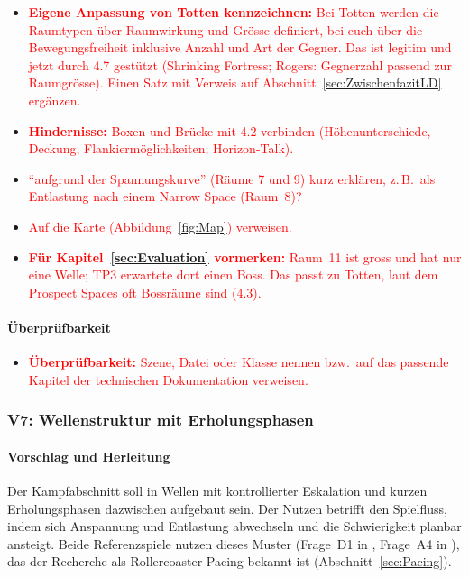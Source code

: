 \documentclass[../Main.tex]{subfiles}
\begin{document}
\begin{itemize}[leftmargin=1.5cm]
    \item \textcolor{red}{\textbf{Eigene Anpassung von Totten kennzeichnen:} Bei Totten werden die Raumtypen über Raumwirkung und Grösse definiert, bei euch über die Bewegungsfreiheit inklusive Anzahl und Art der Gegner. Das ist legitim und jetzt durch 4.7 gestützt (Shrinking Fortress; Rogers: Gegnerzahl passend zur Raumgrösse). Einen Satz mit Verweis auf Abschnitt~\ref{sec:ZwischenfazitLD} ergänzen.}
    \item \textcolor{red}{\textbf{Hindernisse:} Boxen und Brücke mit 4.2 verbinden (Höhenunterschiede, Deckung, Flankiermöglichkeiten; Horizon-Talk).}
    \item \textcolor{red}{\enquote{aufgrund der Spannungskurve} (Räume 7 und 9) kurz erklären, z.\,B.\ als Entlastung nach einem Narrow Space (Raum~8)?}
    \item \textcolor{red}{Auf die Karte (Abbildung~\ref{fig:Map}) verweisen.}
    \item \textcolor{red}{\textbf{Für Kapitel~\ref{sec:Evaluation} vormerken:} Raum~11 ist gross und hat nur eine Welle; TP3 erwartete dort einen Boss. Das passt zu Totten, laut dem Prospect Spaces oft Bossräume sind (4.3).}
\end{itemize}

\paragraph{Überprüfbarkeit}
\begin{itemize}[leftmargin=1.5cm]
    \item \textcolor{red}{\textbf{Überprüfbarkeit:} Szene, Datei oder Klasse nennen bzw.\ auf das passende Kapitel der technischen Dokumentation verweisen.}
\end{itemize}

\subsubsection{V7: Wellenstruktur mit Erholungsphasen} \label{sec:V7}

\paragraph{Vorschlag und Herleitung}
Der Kampfabschnitt soll in Wellen mit kontrollierter Eskalation und kurzen Erholungsphasen dazwischen aufgebaut sein. Der Nutzen betrifft den Spielfluss, indem sich Anspannung und Entlastung abwechseln und die Schwierigkeit planbar ansteigt. Beide Referenzspiele nutzen dieses Muster (Frage~D1 in , Frage~A4 in ), das der Recherche als Rollercoaster-Pacing bekannt ist (Abschnitt~\ref{sec:Pacing}).
\end{document}
